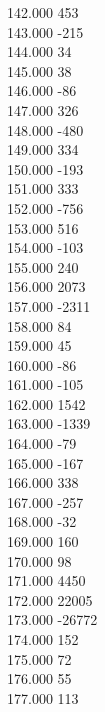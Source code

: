 { 142.000	453 \\
 143.000	-215 \\
 144.000	34 \\
 145.000	38 \\
 146.000	-86 \\
 147.000	326 \\
 148.000	-480 \\
 149.000	334 \\
 150.000	-193 \\
 151.000	333 \\
 152.000	-756 \\
 153.000	516 \\
 154.000	-103 \\
 155.000	240 \\
 156.000	2073 \\
 157.000	-2311 \\
 158.000	84 \\
 159.000	45 \\
 160.000	-86 \\
 161.000	-105 \\
 162.000	1542 \\
 163.000	-1339 \\
 164.000	-79 \\
 165.000	-167 \\
 166.000	338 \\
 167.000	-257 \\
 168.000	-32 \\
 169.000	160 \\
 170.000	98 \\
 171.000	4450 \\
 172.000	22005 \\
 173.000	-26772 \\
 174.000	152 \\
 175.000	72 \\
 176.000	55 \\
 177.000	113 \\
}

